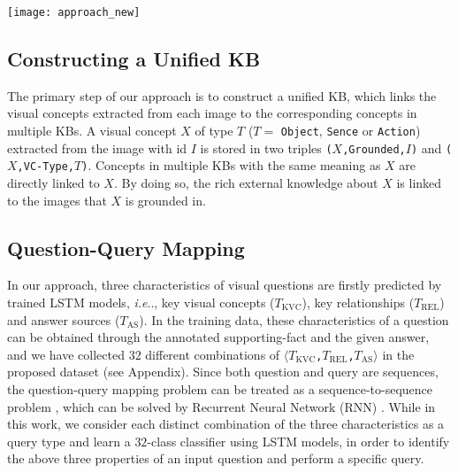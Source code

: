 \documentclass[10pt,journal]{IEEEtran}
\makeatletter
\DeclareRobustCommand\onedot{\futurelet\@let@token\@onedot}
\def\@onedot{\ifx\@let@token.\else.\null\fi\xspace}
\def\ie{\emph{i.e}\onedot} \def\Ie{\emph{I.e}\onedot}
\def\bluett{}
\makeatother
\begin{document}
{\begin{figure*}[tbp!]
\begin{center}
	\texttt{[image: approach\_new]}
\end{center}
\caption{An example of the reasoning process of the proposed VQA approach.
The visual concepts (objects, scene, attributes) of the input image are extracted using trained models, which are further linked to the corresponding semantic entities in the knowledge base.
The input question is firstly mapped to one of the query types using the LSTM model shown in Section~\ref{subsec:QQ_Maping}.
The types of key relationships, key visual concept and answer source can be determined accordingly.
A specific query (see Section~\ref{sec:querying}) is then performed to find all facts meeting the search conditions in KB.
These facts are further matched to the keywords extracted from the question sentence.
The fact with the highest matching score is selected and the answer is also obtained accordingly.}
\label{fig:approach}
\end{figure*}

\subsection{Constructing a Unified KB}
\bluett{
The primary step of our approach is to construct a unified KB, 
which links the visual concepts extracted from each image to the corresponding concepts in multiple KBs.
A visual concept $X$ of type $T$ ($T=$ \texttt{Object}, \texttt{Sence} or \texttt{Action}) 
extracted from the image with id $I$ is stored in two triples 
\texttt{($X$,Grounded,$I$)} and \texttt{($X$,VC-Type,$T$)}.
Concepts in multiple KBs with the same meaning as $X$ are directly linked to $X$.
By doing so, the rich external knowledge about $X$ is linked to the images that $X$ is grounded in.
} 
 
\subsection{Question-Query Mapping}
\label{subsec:QQ_Maping}
In our approach, three characteristics of visual questions are firstly predicted by trained LSTM models, \ie, 
key visual concepts (\texttt{$T_{\mbox{KVC}}$}), key relationships (\texttt{$T_{\mbox{REL}}$}) and answer sources (\texttt{$T_{\mbox{AS}}$}). 
In the training data, these characteristics of a question can be obtained through the annotated supporting-fact and the given answer,
and we have collected $32$ different combinations of $\langle$\texttt{\texttt{$T_{\mbox{KVC}}$},\texttt{$T_{\mbox{REL}}$},\texttt{$T_{\mbox{AS}}$}}$\rangle$ in the proposed dataset (see Appendix). Since both question and query are sequences, the question-query mapping problem can be treated as a sequence-to-sequence problem \cite{sutskever2014sequence}, which can be solved by Recurrent Neural Network (RNN) \cite{mikolov2010recurrent}. While in this work, we consider each distinct combination of the three characteristics as a query type and learn a $32$-class classifier using LSTM models\cite{hochreiter1997long}, in order to identify the above three properties of an input question and perform a specific query.}
\end{document}

